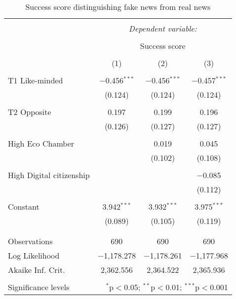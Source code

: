 
\begin{table}[!htbp] \centering 
  \caption{Success score distinguishing fake news from real news} 
  \label{} 
\begin{tabular}{@{\extracolsep{1pt}}lccc} 
\\[-1.8ex]\hline 
\hline \\[-1.8ex] 
 & \multicolumn{3}{c}{\textit{Dependent variable:}} \\ 
\cline{2-4} 
\\[-1.8ex] & \multicolumn{3}{c}{Success score} \\ 
\\[-1.8ex] & (1) & (2) & (3)\\ 
\hline \\[-1.8ex] 
 T1 Like-minded & $-$0.456$^{***}$ & $-$0.456$^{***}$ & $-$0.457$^{***}$ \\ 
  & (0.124) & (0.124) & (0.124) \\ 
  & & & \\ 
 T2 Opposite & 0.197 & 0.199 & 0.196 \\ 
  & (0.126) & (0.127) & (0.127) \\ 
  & & & \\ 
 High Eco Chamber &  & 0.019 & 0.045 \\ 
  &  & (0.102) & (0.108) \\ 
  & & & \\ 
 High Digital citizenship &  &  & $-$0.085 \\ 
  &  &  & (0.112) \\ 
  & & & \\ 
 Constant & 3.942$^{***}$ & 3.932$^{***}$ & 3.975$^{***}$ \\ 
  & (0.089) & (0.105) & (0.119) \\ 
  & & & \\ 
\hline \\[-1.8ex] 
Observations & 690 & 690 & 690 \\ 
Log Likelihood & $-$1,178.278 & $-$1,178.261 & $-$1,177.968 \\ 
Akaike Inf. Crit. & 2,362.556 & 2,364.522 & 2,365.936 \\ 
\hline 
\hline \\[-1.8ex] 
Significance levels & \multicolumn{3}{r}{$^{*}$p$<$0.05; $^{**}$p$<$0.01; $^{***}$p$<$0.001} \\ 
\end{tabular} 
\end{table} 
